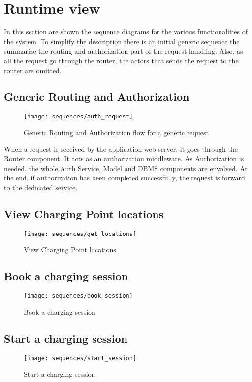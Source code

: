 \clearpage
\newpage

\section{Runtime view}
In this section are shown the sequence diagrams for the various functionalities of the system. To simplify the description there is an initial generic sequence the summarize the routing and authorization part of the request handling. Also, as all the request go through the router, the actors that sends the request to the router are omitted.

\subsection{Generic Routing and Authorization}
\begin{figure}[h]
\texttt{[image: sequences/auth\_request]}
\caption{Generic Routing and Authorization flow for a generic request}
\end{figure}

When a request is received by the application web server, it goes through the Router component. It acts as an authorization middleware. 
As Authorization is needed, the whole Auth Service, Model and DBMS components are envolved.
At the end, if authorization has been completed successfully, the request is forward to the dedicated service.


\subsection{View Charging Point locations}
\begin{figure}[h]
\texttt{[image: sequences/get\_locations]}
\caption{View Charging Point locations}
\end{figure}
\clearpage

\subsection{Book a charging session}
\begin{figure}[h]
\texttt{[image: sequences/book\_session]}
\caption{Book a charging session}
\end{figure}

\subsection{Start a charging session}
\begin{figure}[h]
\texttt{[image: sequences/start\_session]}
\caption{Start a charging session}
\end{figure}
\clearpage

